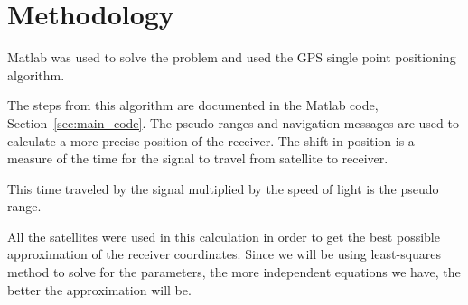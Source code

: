 \section{Methodology} 

\label{sec:methodology}

Matlab was used to solve the problem and used the GPS single point positioning algorithm.\cite{milanGPS} 

The steps from this algorithm are documented in the Matlab code, Section~\ref{sec:main_code}. The pseudo ranges and navigation messages are used to calculate a more precise position of the receiver.  The shift in position is a measure of the time for the signal to travel from satellite to receiver. 

This time traveled by the signal multiplied by the speed of light is the pseudo range.  

All the satellites were used in this calculation in order to get the best possible approximation of the receiver coordinates.  Since we will be using least-squares method to solve for the parameters, the more independent equations we have, the better the approximation will be.   




